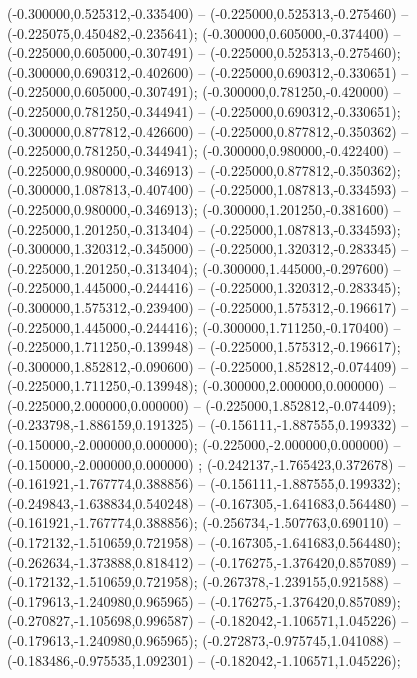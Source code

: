  (-0.300000,0.525312,-0.335400) -- (-0.225000,0.525313,-0.275460) -- (-0.225075,0.450482,-0.235641);
 (-0.300000,0.605000,-0.374400) -- (-0.225000,0.605000,-0.307491) -- (-0.225000,0.525313,-0.275460);
 (-0.300000,0.690312,-0.402600) -- (-0.225000,0.690312,-0.330651) -- (-0.225000,0.605000,-0.307491);
 (-0.300000,0.781250,-0.420000) -- (-0.225000,0.781250,-0.344941) -- (-0.225000,0.690312,-0.330651);
 (-0.300000,0.877812,-0.426600) -- (-0.225000,0.877812,-0.350362) -- (-0.225000,0.781250,-0.344941);
 (-0.300000,0.980000,-0.422400) -- (-0.225000,0.980000,-0.346913) -- (-0.225000,0.877812,-0.350362);
 (-0.300000,1.087813,-0.407400) -- (-0.225000,1.087813,-0.334593) -- (-0.225000,0.980000,-0.346913);
 (-0.300000,1.201250,-0.381600) -- (-0.225000,1.201250,-0.313404) -- (-0.225000,1.087813,-0.334593);
 (-0.300000,1.320312,-0.345000) -- (-0.225000,1.320312,-0.283345) -- (-0.225000,1.201250,-0.313404);
 (-0.300000,1.445000,-0.297600) -- (-0.225000,1.445000,-0.244416) -- (-0.225000,1.320312,-0.283345);
 (-0.300000,1.575312,-0.239400) -- (-0.225000,1.575312,-0.196617) -- (-0.225000,1.445000,-0.244416);
 (-0.300000,1.711250,-0.170400) -- (-0.225000,1.711250,-0.139948) -- (-0.225000,1.575312,-0.196617);
 (-0.300000,1.852812,-0.090600) -- (-0.225000,1.852812,-0.074409) -- (-0.225000,1.711250,-0.139948);
 (-0.300000,2.000000,0.000000) -- (-0.225000,2.000000,0.000000) -- (-0.225000,1.852812,-0.074409);
 (-0.233798,-1.886159,0.191325) -- (-0.156111,-1.887555,0.199332) -- (-0.150000,-2.000000,0.000000);
 (-0.225000,-2.000000,0.000000) -- (-0.150000,-2.000000,0.000000) ;
 (-0.242137,-1.765423,0.372678) -- (-0.161921,-1.767774,0.388856) -- (-0.156111,-1.887555,0.199332);
 (-0.249843,-1.638834,0.540248) -- (-0.167305,-1.641683,0.564480) -- (-0.161921,-1.767774,0.388856);
 (-0.256734,-1.507763,0.690110) -- (-0.172132,-1.510659,0.721958) -- (-0.167305,-1.641683,0.564480);
 (-0.262634,-1.373888,0.818412) -- (-0.176275,-1.376420,0.857089) -- (-0.172132,-1.510659,0.721958);
 (-0.267378,-1.239155,0.921588) -- (-0.179613,-1.240980,0.965965) -- (-0.176275,-1.376420,0.857089);
 (-0.270827,-1.105698,0.996587) -- (-0.182042,-1.106571,1.045226) -- (-0.179613,-1.240980,0.965965);
 (-0.272873,-0.975745,1.041088) -- (-0.183486,-0.975535,1.092301) -- (-0.182042,-1.106571,1.045226);
